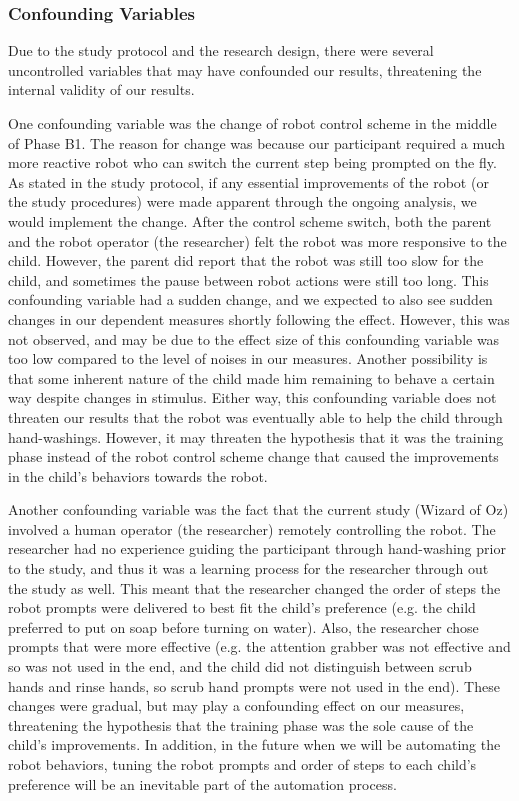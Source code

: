 \subsubsection{Confounding Variables}
Due to the study protocol and the research design, there were several uncontrolled variables that may have confounded our results, threatening the internal validity of our results.

One confounding variable was the change of robot control scheme in the middle of Phase B1.  The reason for change was because our participant required a much more reactive robot who can switch the current step being prompted on the fly.  As stated in the study protocol, if any essential improvements of the robot (or the study procedures) were made apparent through the ongoing analysis, we would implement the change.  After the control scheme switch, both the parent and the robot operator (the researcher) felt the robot was more responsive to the child.  However, the parent did report that the robot was still too slow for the child, and sometimes the pause between robot actions were still too long.  This confounding variable had a sudden change, and we expected to also see sudden changes in our dependent measures shortly following the effect.  However, this was not observed, and may be due to the effect size of this confounding variable was too low compared to the level of noises in our measures.  Another possibility is that some inherent nature of the child made him remaining to behave a certain way despite changes in stimulus.  Either way, this confounding variable does not threaten our results that the robot was eventually able to help the child through hand-washings.  However, it may threaten the hypothesis that it was the training phase instead of the robot control scheme change that caused the improvements in the child's behaviors towards the robot.

Another confounding variable was the fact that the current study (Wizard of Oz) involved a human operator (the researcher) remotely controlling the robot.  The researcher had no experience guiding the participant through hand-washing prior to the study, and thus it was a learning process for the researcher through out the study as well.  This meant that the researcher changed the order of steps the robot prompts were delivered to best fit the child's preference (e.g. the child preferred to put on soap before turning on water).  Also, the researcher chose prompts that were more effective (e.g. the attention grabber was not effective and so was not used in the end, and the child did not distinguish between scrub hands and rinse hands, so scrub hand prompts were not used in the end).  These changes were gradual, but may play a confounding effect on our measures, threatening the hypothesis that the training phase was the sole cause of the child's improvements.  In addition, in the future when we will be automating the robot behaviors, tuning the robot prompts and order of steps to each child's preference will be an inevitable part of the automation process.

